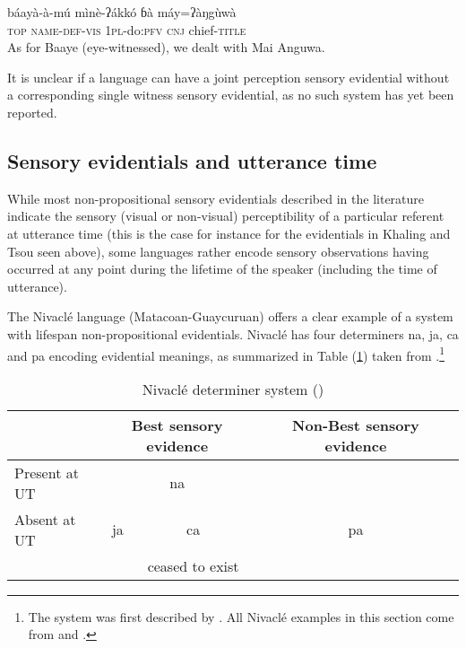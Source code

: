 \documentclass[oneside,a4paper,11pt]{article}
\newcommand{\ipa}[1]{{\phon \mbox{#1}}} %
\begin{document}
 \begin{exe}
\ex \label{ex:baayaamu}
\gll \ipa{tò} 	\ipa{báayà-à-mú} 	\ipa{mìnè-ʔákkó} 	\ipa{ɓà} 	\ipa{máy=ʔàŋgùwà}  \\
\textsc{top} \textsc{name-def-vis} \textsc{1pl}-do:\textsc{pfv} \textsc{cnj} chief-\textsc{title} \\
\glt As for Baaye (eye-witnessed), we dealt with Mai Anguwa.
\end{exe}

It is unclear if a language can have a joint perception sensory evidential without a corresponding single witness sensory evidential, as no such system has yet been reported.

\subsection{Sensory evidentials and utterance time} \label{sec:UT}
While most non-propositional sensory evidentials described in the literature indicate the sensory (visual or non-visual) perceptibility of a particular referent at utterance time (this is the case for instance for the evidentials in Khaling  and Tsou seen above), some languages rather encode sensory observations having occurred at any point during the lifetime of the speaker (including the time of utterance). 

  The Nivaclé language (Matacoan-Guaycuruan) offers a clear example of a system with lifespan non-propositional evidentials. Nivaclé has four determiners \ipa{na}, \ipa{ja}, \ipa{ca}  and \ipa{pa} encoding evidential meanings, as summarized in Table (\ref{tab:nivakle}) taken from \citet{gutierrez14determiners}.\footnote{The system was first described by \citet[363]{stell89niwakle}. All Nivaclé examples in this section come from \citet{gutierrez11evidentiality} and \citet{gutierrez14determiners}.}  
  
  
\begin{table}[H]
\caption{Nivaclé determiner system (\citealt{gutierrez14determiners}) } \centering \label{tab:nivakle}
\begin{tabular}{l|c|cc|cc}
\toprule
&\multicolumn{2}{c}{Best sensory evidence} &&Non-Best sensory evidence \\
\hline
Present at UT & \multicolumn{2}{c}{\ipa{na}}&& \\
\cline{1-4}
Absent at UT &\ipa{ja} & \ipa{ca}&&\ipa{pa}& \\
&&ceased to exist&\\
\bottomrule
\end{tabular}
\end{table}
   
\end{document}
